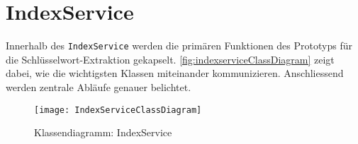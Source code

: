 
\newpage


\section{IndexService}\label{indexservice}



Innerhalb des \texttt{IndexService} werden die primären Funktionen des Prototyps für die Schlüsselwort-Extraktion gekapselt. \autoref{fig:indexserviceClassDiagram} zeigt dabei, wie die wichtigsten Klassen miteinander kommunizieren. Anschliessend werden zentrale Abläufe genauer belichtet. 

    \begin{figure}[H]
    \centering
    \texttt{[image: IndexServiceClassDiagram]}
    \caption{Klassendiagramm: IndexService}
    \label{fig:indexserviceClassDiagram}
    \end{figure}

